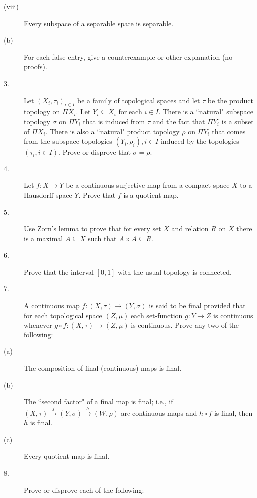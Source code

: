 \documentclass{article}
\begin{document}
\begin{large}
\begin{description}
\item[\quad \quad (viii)]
Every subspace of a separable space is separable.

\item[\quad (b)]
For each false entry, give a counterexample or other explanation (no proofs).

\item[3.]
Let $(X_i, \tau_i)_{i \in I}$ be a family of 
topological spaces and let $\tau$ be the
product topology on $\Pi X_i$. Let $Y_i \subseteq X_i$ for each $i \in I$.
There is a ``natural" subspace topology $\sigma$ on $\Pi Y_i$ that is
induced from $\tau$ and the fact that $\Pi Y_i$ is a subset of
$\Pi X_i$. There is also a ``natural" product topology $\rho$ on
$\Pi Y_i$ that comes from the subspace topologies $(Y_i, \rho_i), i \in I$
induced by the topologies $(\tau_i, i \in I)$. Prove or disprove that
$\sigma = \rho$.

\item[4.]
Let $f : X \to Y$ be a continuous surjective map from a compact space $X$
to a Hausdorff space $Y$. Prove that $f$ is a quotient map.

\item[5.]
Use Zorn's lemma to prove that for every set $X$ and relation $R$ on $X$
there is a maximal $A \subseteq X$ such that $A \times A \subseteq R$.

\item[6.]
Prove that the interval $[0,1]$ with the usual topology is connected.

\vfill\pagebreak

\item[7.]
A continuous map $f:(X, \tau) \to (Y, \sigma)$ is said to be final provided that
for each topological space $(Z, \mu)$ each set-function $g:Y \to Z$ is
continuous whenever $g \circ f:(X,\tau) \to (Z, \mu)$ is continuous.
Prove any two of the following:

\item[\quad (a)]
The composition of final (continuous) maps is final.

\item[\quad (b)]
The ``second factor" of a final map is final; i.e., if
$(X, \tau) \stackrel{f}{\longrightarrow} (Y, \sigma)
\stackrel{h}{\longrightarrow}
(W,\rho)$
are continuous maps and $h \circ f$ is final, then $h$ is final.

\item[\quad (c)]
Every quotient map is final.

\item[8.]
Prove or disprove each of the following:


\end{description}
\end{large}
\end{document}
